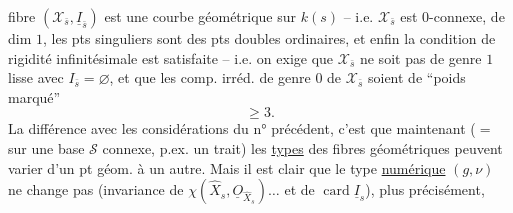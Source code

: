 fibre $(\mathcal X_{\bar s},\underline I_{\bar s})$ est une courbe géométrique sur $k(s)$ -- i.e. $\mathcal X_{\bar s}$ est $0$-connexe, de dim $1$,  les pts singuliers sont  des pts doubles ordinaires, et enfin la condition de rigidité infinitésimale  est satisfaite --  i.e. on exige que $\mathcal X_{\bar s}$ ne soit pas de genre $1$ lisse avec $I_{\bar s}=\varnothing$, et que les comp. irréd. de genre $0$ de $\mathcal X_{\bar s}$ soient de ``poids marqué''
\[
\geq 3.
\]
La différence avec les considérations du n° précédent, c'est que maintenant ($=$ sur une base $\mathcal S$ connexe, p.ex.  un trait) les \uline{types} des fibres géométriques peuvent varier d'un pt géom. à un autre. Mais il est clair que le type \uline{numérique} $(g,\nu)$ ne change pas (invariance de $\chi(\widehat X_s,\underline O_{\widehat X_s})\ldots$ et de $\operatorname{card}\underline I_s$), plus précisément,
